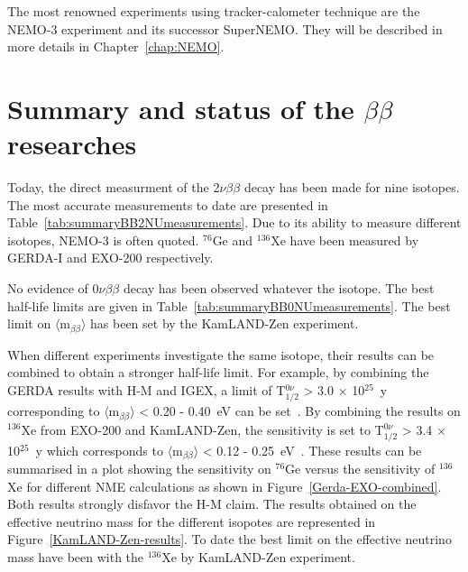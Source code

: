 \documentclass[main.tex]{subfiles}
\begin{document}
\NI The most renowned experiments using tracker-calometer technique are the NEMO-3 experiment and its successor SuperNEMO. They will be described in more details in Chapter~\ref{chap:NEMO}.


\section{Summary and status of the $\beta\beta$ researches}\label{sec:StatusDBD}


\NI Today, the direct measurment of the 2$\nu\beta\beta$ decay has been made for nine isotopes. The most accurate measurements to date are presented in Table~\ref{tab:summaryBB2NUmeasurements}. Due to its ability to measure different isotopes, NEMO-3 is often quoted. $^{\text{76}}$Ge and $^{\text{136}}$Xe have been measured by GERDA-I and EXO-200 respectively.


\bigskip


\NI No evidence of 0$\nu\beta\beta$ decay has been observed whatever the isotope. The best half-life limits are given in Table~\ref{tab:summaryBB0NUmeasurements}. The best limit on $\langle \text{m}_{\beta\beta} \rangle$ has been set by the KamLAND-Zen experiment.


\bigskip


\NI When different experiments investigate the same isotope, their results can be combined to obtain a stronger half-life limit. For example, by combining the GERDA results with H-M and IGEX, a limit of T$_{\text{1/2}}^{\text{0}\nu}$ > 3.0 $\times$ 10$^{\text{25}}$~y corresponding to $\langle \text{m}_{\beta\beta} \rangle$ < 0.20 - 0.40~eV can be set~\cite{GERDA}.  By combining the results on $^{\text{136}}$Xe from EXO-200 and KamLAND-Zen, the sensitivity is set to T$_{\text{1/2}}^{\text{0}\nu}$ > 3.4 $\times$ 10$^{\text{25}}$~y which corresponds to $\langle \text{m}_{\beta\beta} \rangle$ < 0.12 - 0.25~eV~\cite{KamLAND-Zen}. These results can be summarised in a plot showing the sensitivity on $^{\text{76}}$Ge versus the sensitivity of $^{\text{136}}$Xe for different NME calculations as shown in Figure~\ref{Gerda-EXO-combined}. Both results strongly disfavor the H-M claim. The results obtained on the effective neutrino mass for the different isopotes are represented in Figure~\ref{KamLAND-Zen-results}. To date the best limit on the effective neutrino mass have been with the $^{\text{136}}$Xe by KamLAND-Zen experiment.
\end{document}
